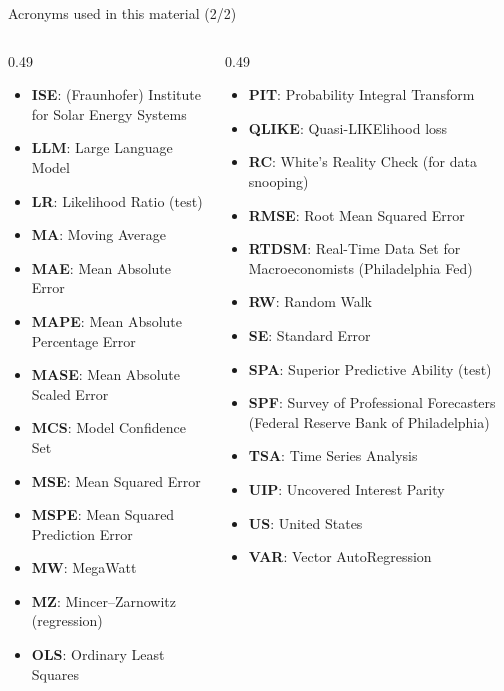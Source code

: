 \begin{frame}{Acronyms used in this material (2/2)}
\begin{columns}[T]
\begin{column}{0.49\textwidth}
\begin{itemize}\setlength{\itemsep}{0pt}
    \item \textbf{ISE}: (Fraunhofer) Institute for Solar Energy Systems
    \item \textbf{LLM}: Large Language Model
    \item \textbf{LR}: Likelihood Ratio (test)
    \item \textbf{MA}: Moving Average
    \item \textbf{MAE}: Mean Absolute Error
    \item \textbf{MAPE}: Mean Absolute Percentage Error
    \item \textbf{MASE}: Mean Absolute Scaled Error
    \item \textbf{MCS}: Model Confidence Set
    \item \textbf{MSE}: Mean Squared Error
    \item \textbf{MSPE}: Mean Squared Prediction Error
    \item \textbf{MW}: MegaWatt
    \item \textbf{MZ}: Mincer–Zarnowitz (regression)
    \item \textbf{OLS}: Ordinary Least Squares
\end{itemize}
\end{column}
\begin{column}{0.49\textwidth}
\begin{itemize}\setlength{\itemsep}{0pt}
    \item \textbf{PIT}: Probability Integral Transform
    \item \textbf{QLIKE}: Quasi-LIKElihood loss
    \item \textbf{RC}: White's Reality Check (for data snooping)
    \item \textbf{RMSE}: Root Mean Squared Error
    \item \textbf{RTDSM}: Real-Time Data Set for Macroeconomists (Philadelphia Fed)
    \item \textbf{RW}: Random Walk
    \item \textbf{SE}: Standard Error
    \item \textbf{SPA}: Superior Predictive Ability (test)
    \item \textbf{SPF}: Survey of Professional Forecasters (Federal Reserve Bank of Philadelphia)
    \item \textbf{TSA}: Time Series Analysis
    \item \textbf{UIP}: Uncovered Interest Parity
    \item \textbf{US}: United States
    \item \textbf{VAR}: Vector AutoRegression
\end{itemize}
\end{column}
\end{columns}
\end{frame}

